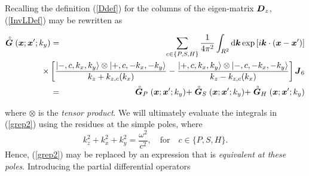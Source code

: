 Recalling the definition (\ref{Ddef}) for the columns of the eigen-matrix 
${\mbox{\boldmath$\mit D$\unboldmath}}_{z}$, (\ref{InvLDef}) may be rewritten as 
\begin{samepage} 
\begin{eqnarray}\label{grep2}
\rf{\bmi  G}({\bmi  x};{{\bmi  x}}^{\prime};k_y)& =&\sum\limits_{c\in \{P,S,H\}}
{\frac{1}{4{ \pi }^{2}}}\int_{{R}^{2}} {\rm d}{\bmi k} \exp \left[{i {\bmi k}  \cdot 
  ({\bmi x}-{\bmi x}^{\prime})}\right]\nonumber\\
&&\!\!\!\!\!\!\!\!\!\!\!\!\!\!\!\!\!\!
\times\left[{{\frac{
  \left|-,c, k_{x},k_{y}  \right\rangle\otimes \left|+,c, -k_{x},-k_{y}  \right\rangle
  }{{k}_{z}+{k}_{z, c }({k}_{x})}}-{\frac{
\left|+,c, k_{x},k_{y}  \right\rangle\otimes \left|-,c, -k_{x},-k_{y}  \right\rangle
  }{{k}_{z}-{k}_{z, c }({k}_{x})}}}\right]{\bmi J}_{6}
\nonumber\\
&=&
\rf{\bmi  G}_{P}({\bmi  x};{{\bmi  x}}^{\prime};k_y)+
\rf{\bmi  G}_{S}({\bmi  x};{{\bmi  x}}^{\prime};k_y)+
\rf{\bmi  G}_{H}({\bmi  x};{{\bmi  x}}^{\prime};k_y)
\end{eqnarray} 
\end{samepage}
where  $\otimes$ is the {\em tensor product\/}.
We will ultimately evaluate the integrals in (\ref{grep2}) using the 
residues at the simple poles, where  
\begin{equation} \label{dispersion}
{k}^2_{z}+{k}^2_{x}+{k}^2_{y}=\frac{\omega^2}{c^2},\quad \mbox{for}\quad c\in\{P,S,H\}.
\end{equation}
Hence,  (\ref{grep2}) may be replaced by an expression that is 
{\em equivalent at these poles\/}. Introducing the partial differential 
operators

